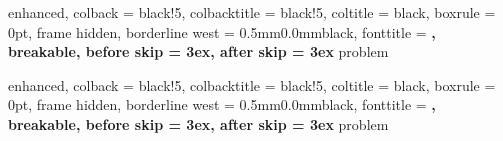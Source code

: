 
\titlespacing*{\chapter}{0cm}{-2.0cm}{0.50cm} %
\titlespacing*{\section}{0cm}{0.50cm}{0.25cm}

\setlength{\parindent}{0pt}  %
\setlength{\parskip}{1ex}    %

%
{ enhanced,
  colback       = black!5,               %
  colbacktitle  = black!5,               %
  coltitle      = black,                  %
  boxrule       = 0pt,                    %
  frame hidden,                           %
  borderline west = {0.5mm}{0.0mm}{black},%
  fonttitle     = \bfseries\sffamily,      %
  breakable,                              %
  before skip   = 3ex,                    %
  after skip    = 3ex                     %
}{problem}

%
{ enhanced,
  colback       = black!5,               %
  colbacktitle  = black!5,               %
  coltitle      = black,                  %
  boxrule       = 0pt,                    %
  frame hidden,                           %
  borderline west = {0.5mm}{0.0mm}{black},%
  fonttitle     = \bfseries\sffamily,      %
  breakable,                              %
  before skip   = 3ex,                    %
  after skip    = 3ex                     %
}{problem}

